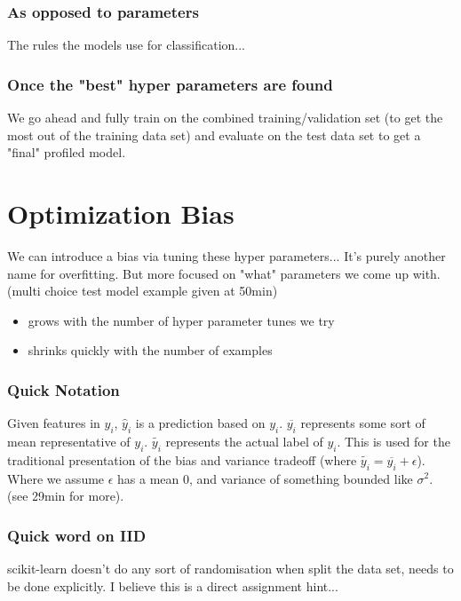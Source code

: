 \documentclass{article}
\begin{document}
\subsubsection*{As opposed to parameters}
The rules the models use for classification...

\subsubsection*{Once the "best" hyper parameters are found}
We go ahead and fully train on the combined training/validation set (to get the most out of the training data set) and evaluate on the test data set to get a "final" profiled model.

\section*{Optimization Bias}
We can introduce a bias via tuning these hyper parameters... It's purely another name for overfitting. But more focused on "what" parameters we come up with. (multi choice test model example given at 50min)

\begin{itemize}
	\item grows with the number of hyper parameter tunes we try
	\item shrinks quickly with the number of examples
\end{itemize}

\subsubsection*{Quick Notation}
Given features in $y_i$, $\hat y_i$ is a prediction based on $y_i$. $\overline{y_i}$ represents some sort of mean representative of $y_i$. $\widetilde{y_i}$ represents the actual label of $y_i$. This is used for the traditional presentation of the bias and variance tradeoff (where $\widetilde{y_i} = \overline{y_i} + \epsilon$). Where we assume $\epsilon$ has a mean 0, and variance of something bounded like $\sigma^2$. (see 29min for more).

\subsubsection*{Quick word on IID}
scikit-learn doesn't do any sort of randomisation when split the data set, needs to be done explicitly. I believe this is a direct assignment hint...
\end{document}
